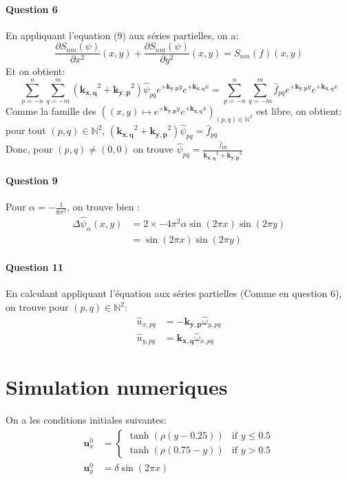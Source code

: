 \documentclass{article}
\newcommand{\pd}[2]{\dfrac{\partial#1}{\partial#2}}
\newcommand{\complex}[1]{\bm{#1}}
\newcommand{\kxq}{\complex{k_{x,q}}}
\newcommand{\kyp}{\complex{k_{y,p}}}
\begin{document}
\paragraph{Question 6}
En appliquant l'equation (9) aux séries partielles, on a:
\begin{equation}
	\pd{S_{nm}(\psi)}{x^2}(x,y)
    + 
	\pd{S_{nm}(\psi)}{y^2}(x,y)
	= S_{nm}(f)(x,y)
    \label{eq:poisson}
\end{equation}
Et on obtient:
\begin{equation*}
    \sum_{p=-n}^{n} \sum_{q=-m}^{m} (\kxq^2 + \kyp^2) \hat{\psi}_{pq} e^{+\kyp y} e^{+\kxq x}
	=
		\sum_{p=-n}^{n} \sum_{q=-m}^{m}\hat{f}_{pq} e^{+\kyp y} e^{+\kxq x}
\end{equation*}
Comme la famille des \(((x, y)\mapsto e^{+\kyp y} e^{+\kxq x})_{(p,q)\in\mathbb N^2}\)
est libre, on obtient: pour tout \((p,q)\in\mathbb N^2\), \((\kxq^2 + \kyp^2) \hat{\psi}_{pq} = \hat{f}_{pq}\)
\\
Donc, pour \((p,q)\neq(0,0)\) on trouve \(\hat{\psi}_{pq} = \frac{\hat{f}_{pq}}{\kxq^2 + \kyp^2}\)

\paragraph{Question 9}
Pour \(\alpha = -\frac{1}{8\pi^2}\), on trouve bien :
\begin{align*}
	\Delta \hat{\psi}_{\alpha}(x,y) & = 2\times-4\pi^2\alpha\sin(2\pi x)\sin(2\pi y)\\
	& = \sin(2\pi x)\sin(2\pi y)
\end{align*}

\paragraph{Question 11}
En calculant appliquant l'équation aux séries partielles (Comme en question 6), on trouve pour \((p,q)\in\mathbb N^2\):
\begin{align*}
	\hat{u}_{x,pq} & = -\kyp\hat{\omega}_{y,pq}\\
	\hat{u}_{y,pq} & = \kxq\hat{\omega}_{x,pq}
\end{align*}

\section{Simulation numeriques}

On a les conditions initiales suivantes:
\begin{align*}
	\mathbf{u}_x^0 &= \begin{cases}
		\tanh\left(\rho(y-0.25)\right) & \text{if }y\leq 0.5 \\
		\tanh\left(\rho(0.75-y)\right) & \text{if }y > 0.5
	\end{cases} \\
	\mathbf{u}_y^0 &= \delta\sin(2\pi x)
\end{align*}
\end{document}
